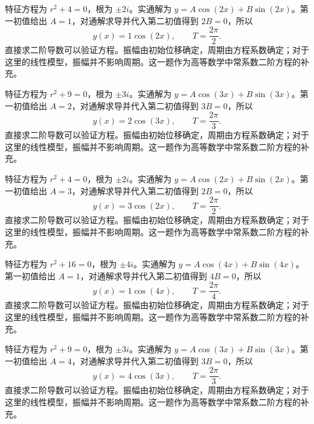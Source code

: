 \documentclass[UTF8,12pt,a4paper,fontset=fandol]{ctexart}
\begin{document}
\begin{solve}\label{ans:c22q20}
特征方程为 $r^2+4=0$，根为 $\pm 2i$。实通解为 $y=A\cos(2x)+B\sin(2x)$。第一初值给出 $A=1$，对通解求导并代入第二初值得到 $2B=0$，所以
\[
y(x)=1\cos(2x),\qquad T=\frac{2\pi}{2}.
\]
直接求二阶导数可以验证方程。振幅由初始位移确定，周期由方程系数确定；对于这里的线性模型，振幅并不影响周期。这一题作为高等数学中常系数二阶方程的补充。
\end{solve}

\begin{solve}\label{ans:c22q21}
特征方程为 $r^2+9=0$，根为 $\pm 3i$。实通解为 $y=A\cos(3x)+B\sin(3x)$。第一初值给出 $A=2$，对通解求导并代入第二初值得到 $3B=0$，所以
\[
y(x)=2\cos(3x),\qquad T=\frac{2\pi}{3}.
\]
直接求二阶导数可以验证方程。振幅由初始位移确定，周期由方程系数确定；对于这里的线性模型，振幅并不影响周期。这一题作为高等数学中常系数二阶方程的补充。
\end{solve}

\begin{solve}\label{ans:c22q22}
特征方程为 $r^2+4=0$，根为 $\pm 2i$。实通解为 $y=A\cos(2x)+B\sin(2x)$。第一初值给出 $A=3$，对通解求导并代入第二初值得到 $2B=0$，所以
\[
y(x)=3\cos(2x),\qquad T=\frac{2\pi}{2}.
\]
直接求二阶导数可以验证方程。振幅由初始位移确定，周期由方程系数确定；对于这里的线性模型，振幅并不影响周期。这一题作为高等数学中常系数二阶方程的补充。
\end{solve}

\begin{solve}\label{ans:c22q23}
特征方程为 $r^2+16=0$，根为 $\pm 4i$。实通解为 $y=A\cos(4x)+B\sin(4x)$。第一初值给出 $A=1$，对通解求导并代入第二初值得到 $4B=0$，所以
\[
y(x)=1\cos(4x),\qquad T=\frac{2\pi}{4}.
\]
直接求二阶导数可以验证方程。振幅由初始位移确定，周期由方程系数确定；对于这里的线性模型，振幅并不影响周期。这一题作为高等数学中常系数二阶方程的补充。
\end{solve}

\begin{solve}\label{ans:c22q24}
特征方程为 $r^2+9=0$，根为 $\pm 3i$。实通解为 $y=A\cos(3x)+B\sin(3x)$。第一初值给出 $A=4$，对通解求导并代入第二初值得到 $3B=0$，所以
\[
y(x)=4\cos(3x),\qquad T=\frac{2\pi}{3}.
\]
直接求二阶导数可以验证方程。振幅由初始位移确定，周期由方程系数确定；对于这里的线性模型，振幅并不影响周期。这一题作为高等数学中常系数二阶方程的补充。
\end{solve}
\end{document}
